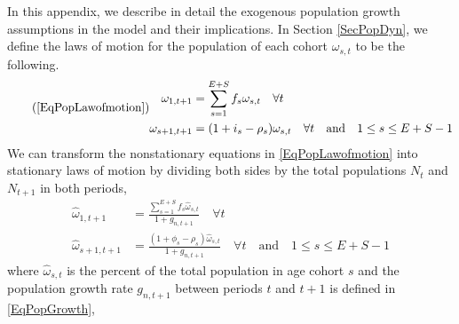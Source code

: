 \documentclass[letterpaper,12pt]{article}
\theoremstyle{definition}
\begin{document}
  In this appendix, we describe in detail the exogenous population growth assumptions in the model and their implications. In Section \ref{SecPopDyn}, we define the laws of motion for the population of each cohort $\omega_{s,t}$ to be the following.
  \begin{equation}\tag{\ref{EqPopLawofmotion}}
    \begin{split}
      \omega_{1,t+1} &= \sum_{s=1}^{E+S} f_s\omega_{s,t}\quad\forall t \\
        \omega_{s+1,t+1} &= (1 + i_s - \rho_s)\omega_{s,t}\quad\forall t\quad\text{and}\quad 1\leq s \leq E+S-1
    \end{split}
  \end{equation}
  We can transform the nonstationary equations in \eqref{EqPopLawofmotion} into stationary laws of motion by dividing both sides by the total populations $N_t$ and $N_{t+1}$ in both periods,
  \begin{equation}\label{EqPopLawofmotionStat}
    \begin{split}
      \hat{\omega}_{1,t+1} &= \frac{\sum_{s=1}^{E+S} f_s\hat{\omega}_{s,t}}{1+g_{n,t+1}}\quad\forall t \\
      \hat{\omega}_{s+1,t+1} &= \frac{(1 + \phi_s - \rho_s)\hat{\omega}_{s,t}}{1+g_{n,t+1}}\quad\forall t\quad\text{and}\quad 1\leq s \leq E+S-1
    \end{split}
  \end{equation}
  where $\hat{\omega}_{s,t}$ is the percent of the total population in age cohort $s$ and the population growth rate $g_{n,t+1}$ between periods $t$ and $t+1$ is defined in \eqref{EqPopGrowth},
\end{document}
